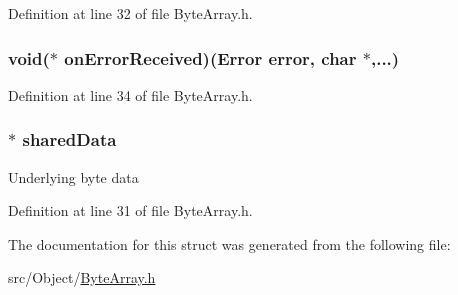 Definition at line 32 of file ByteArray.h.

\hypertarget{struct_byte_array_a3c8af4f580f3041d046b7581f89a9695}{
\subsubsection[{onErrorReceived}]{\setlength{\rightskip}{0pt plus 5cm}void($\ast$ {\bf onErrorReceived})({\bf Error} error, char $\ast$,...)}}
\label{struct_byte_array_a3c8af4f580f3041d046b7581f89a9695}


Definition at line 34 of file ByteArray.h.

\hypertarget{struct_byte_array_a0a0e8cb81138e26f1a3dba7c425f71e1}{
\subsubsection[{sharedData}]{$\ast$ {\bf sharedData}}}
\label{struct_byte_array_a0a0e8cb81138e26f1a3dba7c425f71e1}
Underlying byte data 

Definition at line 31 of file ByteArray.h.



The documentation for this struct was generated from the following file:\begin{DoxyCompactItemize}
\item 
src/Object/\hyperlink{_byte_array_8h}{ByteArray.h}\end{DoxyCompactItemize}
